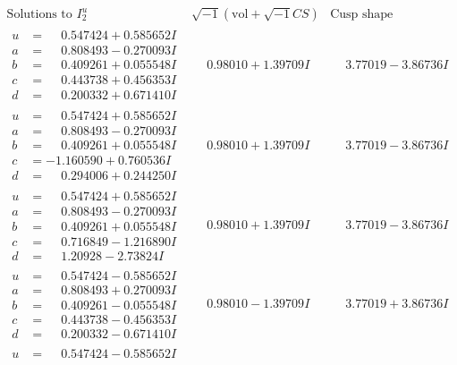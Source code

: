 \documentclass[1p]{elsarticle_modified}
\theoremstyle{definition}
\newcommand{\I}{\sqrt{-1}}
\begin{document}
$$\begin{array}{c|c|c}  
\text{Solutions to }I^u_{2}& \I (\text{vol} + \sqrt{-1}CS) & \text{Cusp shape}\\
 \hline 
\begin{aligned}
u &= \phantom{-}0.547424 + 0.585652 I \\
a &= \phantom{-}0.808493 - 0.270093 I \\
b &= \phantom{-}0.409261 + 0.055548 I \\
c &= \phantom{-}0.443738 + 0.456353 I \\
d &= \phantom{-}0.200332 + 0.671410 I\end{aligned}
 & \phantom{-}0.98010 + 1.39709 I & \phantom{-}3.77019 - 3.86736 I \\ \hline\begin{aligned}
u &= \phantom{-}0.547424 + 0.585652 I \\
a &= \phantom{-}0.808493 - 0.270093 I \\
b &= \phantom{-}0.409261 + 0.055548 I \\
c &= -1.160590 + 0.760536 I \\
d &= \phantom{-}0.294006 + 0.244250 I\end{aligned}
 & \phantom{-}0.98010 + 1.39709 I & \phantom{-}3.77019 - 3.86736 I \\ \hline\begin{aligned}
u &= \phantom{-}0.547424 + 0.585652 I \\
a &= \phantom{-}0.808493 - 0.270093 I \\
b &= \phantom{-}0.409261 + 0.055548 I \\
c &= \phantom{-}0.716849 - 1.216890 I \\
d &= \phantom{-}1.20928 - 2.73824 I\end{aligned}
 & \phantom{-}0.98010 + 1.39709 I & \phantom{-}3.77019 - 3.86736 I \\ \hline\begin{aligned}
u &= \phantom{-}0.547424 - 0.585652 I \\
a &= \phantom{-}0.808493 + 0.270093 I \\
b &= \phantom{-}0.409261 - 0.055548 I \\
c &= \phantom{-}0.443738 - 0.456353 I \\
d &= \phantom{-}0.200332 - 0.671410 I\end{aligned}
 & \phantom{-}0.98010 - 1.39709 I & \phantom{-}3.77019 + 3.86736 I \\ \hline\begin{aligned}
u &= \phantom{-}0.547424 - 0.585652 I \\

\end{aligned}
\end{array}$$
\end{document}
